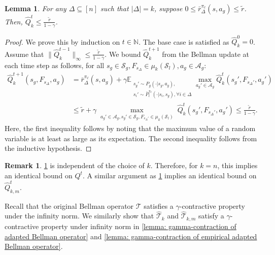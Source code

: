 \documentclass{article}
\theoremstyle{plain}
\newtheorem{lemma}[theorem]{Lemma}
\theoremstyle{definition}
\newtheorem{remark}[theorem]{Remark}
\begin{document}
\begin{lemma}
\label{lemma: Q-bound}
{For any $\Delta\subseteq[n]$ such that $|\Delta|=k$, suppose $0\leq \bar{r}^{\pi_\ell}_\Delta(s,a_g)\leq \tilde{r}$. Then, $\hat{Q}_k^t \leq \frac{\tilde{r}}{1-\gamma}$.}
\end{lemma}
\begin{proof}
    We prove this by induction on $t\in\mathbb{N}$. The base case is satisfied as $\hat{Q}_k^0 = 0$. Assume that $\|\hat{Q}_k^{t-1}\|_\infty \leq \frac{\tilde{r}}{1-\gamma}$. We bound $\hat{Q}_k^{t+1}$ from the Bellman update at each time step as follows, for all $s_g\in\mathcal{S}_g,F_{s_\Delta}\in \mu_k({\mathcal{S}_l}), a_g\in\mathcal{A}_g$:
    \begin{align*}
        \hat{Q}_k^{t+1}(s_g,F_{s_\Delta},a_g) &= \bar{r}^{\pi_\ell}_\Delta(s,a_g) + \gamma\mathbb{E}_{\substack{s_g'\sim P_g(\cdot|s_g, a_g), \\ s_i' \sim \bar{P}^{\pi_\ell}_l(\cdot|s_i,s_g), \forall i\in\Delta}}\max_{a_g'\in\mathcal{A}_g}\hat{Q}_k^t(s_g',F_{s_\Delta'},a_g') \\
        &\leq \tilde{r} + \gamma \max_{\substack{a_g'\in\mathcal{A}_g, s_g' \in \mathcal{S}_g, F_{s_\Delta'} \in \mu_k{(\mathcal{S}_l)}}}\hat{Q}_k^t(s_g',F_{s_\Delta'},a_g') \leq \frac{\tilde{r}}{1-\gamma}.
    \end{align*}
Here, the first inequality follows by noting that the maximum value of a random variable is at least as large as its expectation. The second inequality follows from the inductive hypothesis.\qedhere
\end{proof}

\begin{remark}\cref{lemma: Q-bound} is independent of the choice of $k$. Therefore, for $k=n$, this implies an identical bound on $Q^t$. A similar argument as \cref{lemma: Q-bound} implies an identical bound on $\hat{Q}_{k,m}^t$.
\end{remark}

Recall that the original Bellman operator $\mathcal{T}$ satisfies a $\gamma$-contractive property under the infinity norm. We similarly show that $\hat{\mathcal{T}}_k$ and $\hat{\mathcal{T}}_{k,m}$ satisfy a $\gamma$-contractive property under infinity norm in \cref{lemma: gamma-contraction of adapted Bellman operator} and \cref{lemma: gamma-contraction of empirical adapted Bellman operator}.
\end{document}
